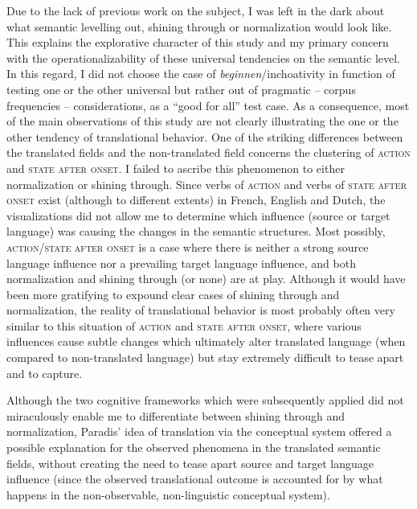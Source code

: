 Due to the lack of previous work on the subject, I was left in the dark about what semantic levelling out, shining through or normalization would look like. This explains the explorative character of this study and my primary concern with the operationalizability of these universal tendencies on the semantic level. In this regard, I did not choose the case of \textit{beginnen}\slash inchoativity in function of testing one or the other universal but rather out of pragmatic – corpus frequencies – considerations, as a ``good for all'' test case. As a consequence, most of the main observations of this study are not clearly illustrating the one or the other tendency of translational behavior. One of the striking differences between the translated fields and the non-translated field concerns the clustering of \textsc{action} and \textsc{state after onset}. I failed to ascribe this phenomenon to either normalization or shining through. Since verbs of \textsc{action} and verbs of \textsc{state after onset} exist (although to different extents) in French, English and Dutch, the visualizations did not allow me to determine which influence (source or target language) was causing the changes in the semantic structures. Most possibly, \textsc{action}\slash \textsc{state after onset} is a case where there is neither a strong source language influence nor a prevailing target language influence, and both normalization and shining through (or none) are at play. Although it would have been more gratifying to expound clear cases of shining through and normalization, the reality of translational behavior is most probably often very similar to this situation of \textsc{action} and \textsc{state after onset}, where various influences cause subtle changes which ultimately alter translated language (when compared to non-translated language) but stay extremely difficult to tease apart and to capture. 

Although the two cognitive frameworks which were subsequently applied did not miraculously enable me to differentiate between shining through and normalization, Paradis’ idea of translation via the conceptual system offered a possible explanation for the observed phenomena in the translated semantic fields, without creating the need to tease apart source and target language influence (since the observed translational outcome is accounted for by what happens in the non-observable, non-linguistic conceptual system).

